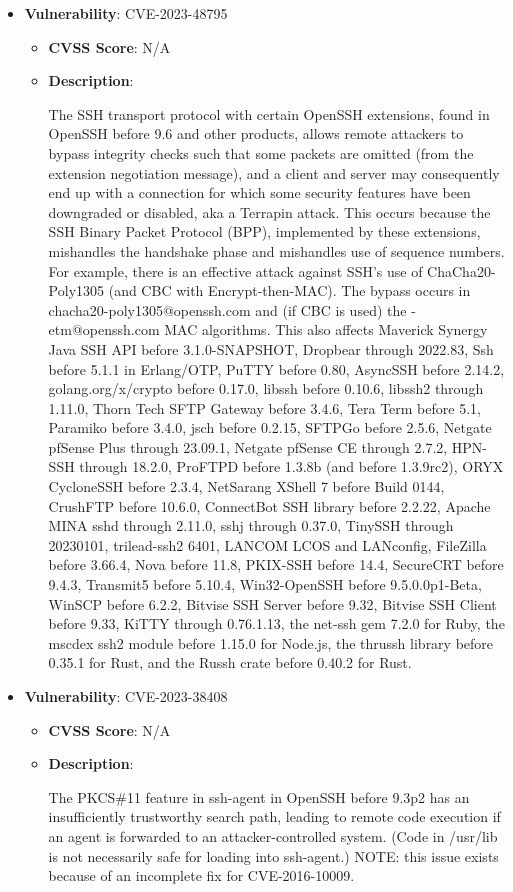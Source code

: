 \documentclass{article}
\begin{document}
\begin{itemize}
        \item \textbf{Vulnerability}: CVE-2023-48795
        \begin{itemize}
            \item \textbf{CVSS Score}:  N/A 
            \item \textbf{Description}:
            \parbox[t]{0.9\linewidth}{
                \ttfamily The SSH transport protocol with certain OpenSSH extensions, found in OpenSSH before 9.6 and other products, allows remote attackers to bypass integrity checks such that some packets are omitted (from the extension negotiation message), and a client and server may consequently end up with a connection for which some security features have been downgraded or disabled, aka a Terrapin attack. This occurs because the SSH Binary Packet Protocol (BPP), implemented by these extensions, mishandles the handshake phase and mishandles use of sequence numbers. For example, there is an effective attack against SSH's use of ChaCha20-Poly1305 (and CBC with Encrypt-then-MAC). The bypass occurs in chacha20-poly1305@openssh.com and (if CBC is used) the -etm@openssh.com MAC algorithms. This also affects Maverick Synergy Java SSH API before 3.1.0-SNAPSHOT, Dropbear through 2022.83, Ssh before 5.1.1 in Erlang/OTP, PuTTY before 0.80, AsyncSSH before 2.14.2, golang.org/x/crypto before 0.17.0, libssh before 0.10.6, libssh2 through 1.11.0, Thorn Tech SFTP Gateway before 3.4.6, Tera Term before 5.1, Paramiko before 3.4.0, jsch before 0.2.15, SFTPGo before 2.5.6, Netgate pfSense Plus through 23.09.1, Netgate pfSense CE through 2.7.2, HPN-SSH through 18.2.0, ProFTPD before 1.3.8b (and before 1.3.9rc2), ORYX CycloneSSH before 2.3.4, NetSarang XShell 7 before Build 0144, CrushFTP before 10.6.0, ConnectBot SSH library before 2.2.22, Apache MINA sshd through 2.11.0, sshj through 0.37.0, TinySSH through 20230101, trilead-ssh2 6401, LANCOM LCOS and LANconfig, FileZilla before 3.66.4, Nova before 11.8, PKIX-SSH before 14.4, SecureCRT before 9.4.3, Transmit5 before 5.10.4, Win32-OpenSSH before 9.5.0.0p1-Beta, WinSCP before 6.2.2, Bitvise SSH Server before 9.32, Bitvise SSH Client before 9.33, KiTTY through 0.76.1.13, the net-ssh gem 7.2.0 for Ruby, the mscdex ssh2 module before 1.15.0 for Node.js, the thrussh library before 0.35.1 for Rust, and the Russh crate before 0.40.2 for Rust.
            }
        \end{itemize}
    
        \item \textbf{Vulnerability}: CVE-2023-38408
        \begin{itemize}
            \item \textbf{CVSS Score}:  N/A 
            \item \textbf{Description}:
            \parbox[t]{0.9\linewidth}{
                \ttfamily The PKCS\#11 feature in ssh-agent in OpenSSH before 9.3p2 has an insufficiently trustworthy search path, leading to remote code execution if an agent is forwarded to an attacker-controlled system. (Code in /usr/lib is not necessarily safe for loading into ssh-agent.) NOTE: this issue exists because of an incomplete fix for CVE-2016-10009.
            }
        \end{itemize}
    

\end{itemize}
\end{document}
